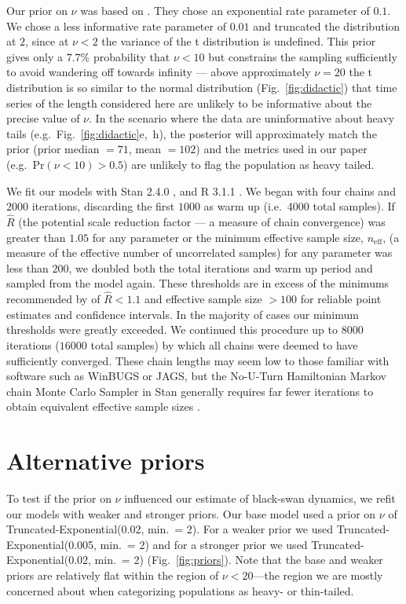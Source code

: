 Our prior on $\nu$ was based on \citet{fernandez1998}. They chose an exponential rate parameter of $0.1$. We chose a less informative rate parameter of $0.01$ and truncated the distribution at $2$, since at $\nu < 2$ the variance of the t distribution is undefined. This prior gives only a $7.7$\% probability that $\nu < 10$ but constrains the sampling sufficiently to avoid wandering off towards infinity --- above approximately $\nu = 20$ the t distribution is so similar to the normal distribution (Fig.~\ref{fig:didactic}) that time series of the length considered here are unlikely to be informative about the precise value of $\nu$. In the scenario where the data are uninformative about heavy tails (e.g.~Fig.~\ref{fig:didactic}e,~h), the posterior will approximately match the prior (prior median $= 71$, mean $= 102$) and the metrics used in our paper (e.g.~Pr$(\nu < 10) > 0.5$) are unlikely to flag the population as heavy tailed.

We fit our models with Stan 2.4.0 \citep{stan-manual2014}, and R 3.1.1 \citep{r2014}. We began with four chains and $2000$ iterations, discarding the first $1000$ as warm up (i.e.~4000 total samples). If $\hat{R}$ (the potential scale reduction factor --- a measure of chain convergence) was greater than $1.05$ for any parameter or the minimum effective sample size, $n_\mathrm{eff}$, (a measure of the effective number of uncorrelated samples) for any parameter was less than $200$, we doubled both the total iterations and warm up period and sampled from the model again. These thresholds are in excess of the minimums recommended by \citet{gelman2006a} of $\hat{R} < 1.1$ and effective sample size $> 100$ for reliable point estimates and confidence intervals. In the majority of cases our minimum thresholds were greatly exceeded. We continued this procedure up to $8000$ iterations ($16000$ total samples) by which all chains were deemed to have sufficiently converged. These chain lengths may seem low to those familiar with software such as WinBUGS or JAGS, but the No-U-Turn Hamiltonian Markov chain Monte Carlo Sampler in Stan generally requires far fewer iterations to obtain equivalent effective sample sizes \citep{stan-manual2014}.

\section{Alternative priors}

To test if the prior on $\nu$ influenced our estimate of black-swan dynamics, we refit our models with weaker and stronger priors. Our base model used a prior on $\nu$ of Truncated-Exponential(0.02, min.\ = 2). For a weaker prior we used Truncated-Exponential(0.005, min.\ = 2) and for a stronger prior we used Truncated-Exponential(0.02, min.\ = 2) (Fig.~\ref{fig:priors}). Note that the base and weaker priors are relatively flat within the region of $\nu < 20$---the region we are mostly concerned about when categorizing populations as heavy- or thin-tailed.

